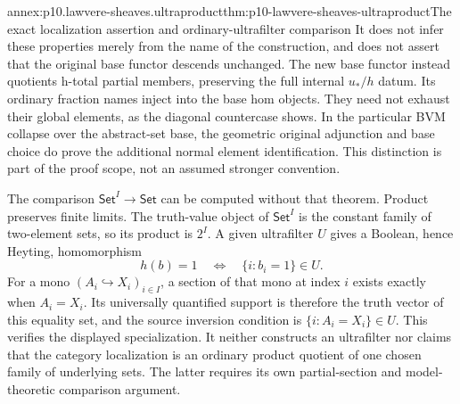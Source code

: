 \begin{annexitem}{annex:p10.lawvere-sheaves.ultraproduct}{thm:p10-lawvere-sheaves-ultraproduct}{The exact localization assertion and ordinary-ultrafilter comparison}
It does not infer these properties merely from the name of the construction,
and does not assert that the original base functor descends unchanged.
The new base functor instead quotients h-total partial members, preserving
the full internal \(u_* / h\) datum. Its ordinary fraction names inject
into the base hom objects. They need not exhaust their global elements,
as the diagonal countercase shows. In the particular BVM collapse over
the abstract-set base, the geometric original adjunction and base choice
do prove the additional normal element identification. This distinction
is part of the proof scope, not an assumed stronger convention.

The comparison \(\mathsf{Set}^I\to\mathsf{Set}\) can be
computed without that theorem.  Product preserves finite limits.
The truth-value object of \(\mathsf{Set}^I\) is the constant
family of two-element sets, so its product is \(2^I\).  A given
ultrafilter \(U\) gives a Boolean, hence Heyting, homomorphism
\[
       h(b)=1\quad\Longleftrightarrow\quad
                         \{i:b_i=1\}\in U.
\]
For a mono \((A_i\hookrightarrow X_i)_{i\in I}\), a section
of that mono at index \(i\) exists exactly when \(A_i=X_i\).
Its universally quantified support is therefore the truth vector
of this equality set, and the source inversion condition is
\(\{i:A_i=X_i\}\in U\).  This verifies the displayed
specialization.  It neither constructs an ultrafilter nor claims
that the category localization is an ordinary product quotient
of one chosen family of underlying sets.  The latter requires
its own partial-section and model-theoretic comparison argument.
\end{annexitem}

